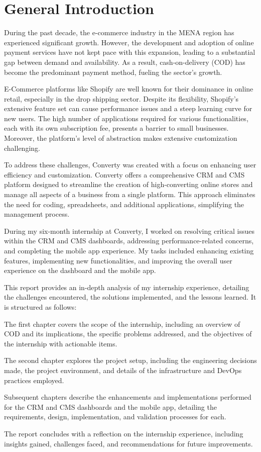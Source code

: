 \chapter*{General Introduction}

During the past decade, the e-commerce industry in the MENA region has experienced significant growth. However, the development and adoption of online payment services have not kept pace with this expansion, leading to a substantial gap between demand and availability. As a result, cash-on-delivery (COD) has become the predominant payment method, fueling the sector's growth.

E-Commerce platforms like Shopify are well known for their dominance in online retail, especially in the drop shipping sector. Despite its flexibility, Shopify’s extensive feature set can cause performance issues and a steep learning curve for new users. The high number of applications required for various functionalities, each with its own subscription fee, presents a barrier to small businesses. Moreover, the platform’s level of abstraction makes extensive customization challenging.

To address these challenges, Converty was created with a focus on enhancing user efficiency and customization. Converty offers a comprehensive CRM and CMS platform designed to streamline the creation of high-converting online stores and manage all aspects of a business from a single platform. This approach eliminates the need for coding, spreadsheets, and additional applications, simplifying the management process.

During my six-month internship at Converty, I worked on resolving critical issues within the CRM and CMS dashboards, addressing performance-related concerns, and completing the mobile app experience. My tasks included enhancing existing features, implementing new functionalities, and improving the overall user experience on the dashboard and the mobile app.
\newline

This report provides an in-depth analysis of my internship experience, detailing the challenges encountered, the solutions implemented, and the lessons learned. It is structured as follows:
\newline

The first chapter covers the scope of the internship, including an overview of COD and its implications, the specific problems addressed, and the objectives of the internship with actionable items.
\newline

The second chapter explores the project setup, including the engineering decisions made, the project environment, and details of the infrastructure and DevOps practices employed.
\newline

Subsequent chapters describe the enhancements and implementations performed for the CRM and CMS dashboards and the mobile app, detailing the requirements, design, implementation, and validation processes for each.
\newline

The report concludes with a reflection on the internship experience, including insights gained, challenges faced, and recommendations for future improvements.

